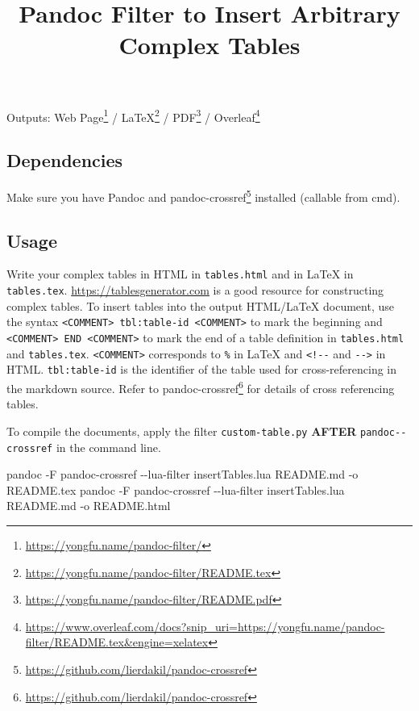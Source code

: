 \documentclass[
]{article}
\title{Pandoc Filter to Insert Arbitrary Complex Tables}
\author{}
\date{}
\newenvironment{Shaded}{}{}
\newcommand{\AttributeTok}[1]{\textcolor[rgb]{0.49,0.56,0.16}{#1}}
\newcommand{\ExtensionTok}[1]{#1}
\newcommand{\NormalTok}[1]{#1}
\DeclareRobustCommand{\href}[2]{#2\footnote{\url{#1}}}
\begin{document}
\maketitle

Outputs: \href{https://yongfu.name/pandoc-filter/}{Web Page} /
\href{https://yongfu.name/pandoc-filter/README.tex}{LaTeX} /
\href{https://yongfu.name/pandoc-filter/README.pdf}{PDF} /
\href{https://www.overleaf.com/docs?snip_uri=https://yongfu.name/pandoc-filter/README.tex\&engine=xelatex}{Overleaf}

\hypertarget{dependencies}{%
\subsection{Dependencies}\label{dependencies}}

Make sure you have Pandoc and
\href{https://github.com/lierdakil/pandoc-crossref}{pandoc-crossref}
installed (callable from cmd).

\hypertarget{usage}{%
\subsection{Usage}\label{usage}}

Write your complex tables in HTML in \texttt{tables.html} and in LaTeX
in \texttt{tables.tex}. \url{https://tablesgenerator.com} is a good
resource for constructing complex tables. To insert tables into the
output HTML/LaTeX document, use the syntax
\texttt{\textless{}COMMENT\textgreater{}\ tbl:table-id\ \textless{}COMMENT\textgreater{}}
to mark the beginning and
\texttt{\textless{}COMMENT\textgreater{}\ END\ \textless{}COMMENT\textgreater{}}
to mark the end of a table definition in \texttt{tables.html} and
\texttt{tables.tex}. \texttt{\textless{}COMMENT\textgreater{}}
corresponds to \texttt{\%} in LaTeX and \texttt{\textless{}!-\/-} and
\texttt{-\/-\textgreater{}} in HTML. \texttt{tbl:table-id} is the
identifier of the table used for cross-referencing in the markdown
source. Refer to
\href{https://github.com/lierdakil/pandoc-crossref}{pandoc-crossref} for
details of cross referencing tables.

To compile the documents, apply the filter \texttt{custom-table.py}
\textbf{AFTER} \texttt{pandoc-\/-crossref} in the command line.

\begin{Shaded}
\begin{Highlighting}[]
\ExtensionTok{pandoc} \AttributeTok{{-}F}\NormalTok{ pandoc{-}crossref }\AttributeTok{{-}{-}lua{-}filter}\NormalTok{ insertTables.lua README.md }\AttributeTok{{-}o}\NormalTok{ README.tex}
\ExtensionTok{pandoc} \AttributeTok{{-}F}\NormalTok{ pandoc{-}crossref }\AttributeTok{{-}{-}lua{-}filter}\NormalTok{ insertTables.lua README.md }\AttributeTok{{-}o}\NormalTok{ README.html}
\end{Highlighting}
\end{Shaded}
\end{document}
